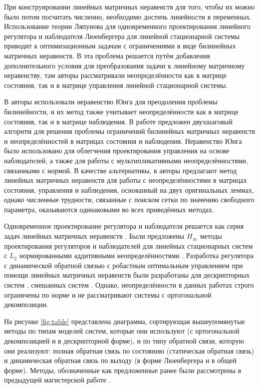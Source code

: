 При конструировании линейных матричных неравенств для того, чтобы их можно было потом посчитать численно, необходимо достичь линейности в переменных. Использование теории Ляпунова для одновременного проектирования линейного регулятора и наблюдателя Люенбергера для линейной стационарной системы приводит к оптимизационным задачам с ограничениями в виде билинейных матричных неравенств. В \cite{LIEN2004} эта проблема решается путём добавления дополнительного условия для преобразования задачи к линейному матричному неравенству, там авторы рассматривали неопределённости как в матрице состояния, так и в матрице управления линейной стационарной системы. 

В \cite{KHELOUFI2013} авторы использовали неравенство Юнга для преодоления проблемы билинейности, и их метод также учитывает неопределённости как в матрице состояния, так и в матрице наблюдения. В работе \cite{ZEMOUCHE2015} предложен двухшаговый алгоритм для решения проблемы ограничений билинейных матричных неравенств и неопределённостей в матрицах состояния и наблюдения. Неравенство Юнга было использовано для облегчения проектирования управления на основе наблюдателей, а также для работы с мультипликативными неопределённостями, связанными с нормой. В качестве альтернативы, в \cite{GRITLI2021} авторы предлагают метод линейных матричных неравенств для работы с неопределённостями в матрицах состояния, управления и наблюдения, основанный на двух оригинальных леммах, однако численные трудности, связанные с поиском сетки по значению свободного параметра, оказываются одинаковыми во всех приведённых методах.

Одновременное проектирование регулятора и наблюдателя решается как серия задач линейных матричных неравенств \cite{ZEMOUCHE2015,GRITLI2021}. Были предложены $H_\infty$ методы проектирования регуляторов и наблюдателей для линейных стационарных систем с $L_2$ нормированными аддитивными неопределённостями \cite{Bennani2019, KHELOUFI2016}. Разработка регулятора с динамической обратной связью с робастным оптимальным управлением при помощи линейных матричных неравенств были разработаны для дескрипторных систем \cite{Izumi2007}, смешанных систем \cite{Boukas2006}. Однако, неопределённости в данных работах строго ограничены по норме и не рассматривают системы с ортогональной декомпозиции.

На рисунке \ref{fig:table} представлена диаграмма, сортирующая вышеупомянутые методы по типам моделей систем, которые они используют (с ортогональной декомпозицией и в дескрипторной форме), и по типу обратной связи, которую они реализуют: полная обратная связь по состоянию (статическая обратная связь) и динамическая обратная связь по выходу (в форме Люенбергера и в общей форме). Методы, обозначенные как предложенные ранее были рассмотрены в предыдущей магистерской работе \cite{Mastersthesis}.

